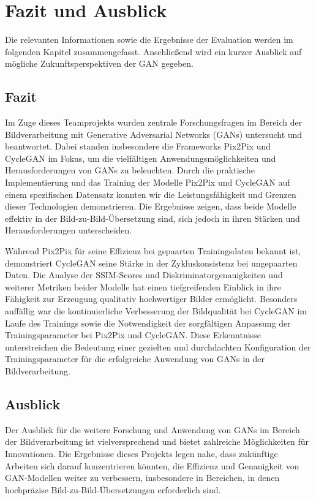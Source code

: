 \chapter{Fazit und Ausblick}

Die relevanten Informationen sowie die Ergebnisse der Evaluation werden im folgenden Kapitel zusammengefasst. Anschließend wird ein kurzer Ausblick auf mögliche Zukunftsperspektiven der GAN gegeben.

\section{Fazit}
Im Zuge dieses Teamprojekts wurden zentrale Forschungsfragen im Bereich der Bildverarbeitung mit Generative Adversarial Networks (GANs) untersucht und beantwortet. Dabei standen insbesondere die Frameworks Pix2Pix und CycleGAN im Fokus, um die vielfältigen Anwendungsmöglichkeiten und Herausforderungen von GANs zu beleuchten. Durch die praktische Implementierung und das Training der Modelle Pix2Pix und CycleGAN auf einem spezifischen Datensatz konnten wir die Leistungsfähigkeit und Grenzen dieser Technologien demonstrieren. Die Ergebnisse zeigen, dass beide Modelle effektiv in der Bild-zu-Bild-Übersetzung sind, sich jedoch in ihren Stärken und Herausforderungen unterscheiden.

Während Pix2Pix für seine Effizienz bei gepaarten Trainingsdaten bekannt ist, demonstriert CycleGAN seine Stärke in der Zykluskonsistenz bei ungepaarten Daten. Die Analyse der SSIM-Scores und Diskriminatorgenauigkeiten und weiterer Metriken beider Modelle hat einen tiefgreifenden Einblick in ihre Fähigkeit zur Erzeugung qualitativ hochwertiger Bilder ermöglicht. Besonders auffällig war die kontinuierliche Verbesserung der Bildqualität bei CycleGAN im Laufe des Trainings sowie die Notwendigkeit der sorgfältigen Anpassung der Trainingsparameter bei Pix2Pix und CycleGAN. Diese Erkenntnisse unterstreichen die Bedeutung einer gezielten und durchdachten Konfiguration der Trainingsparameter für die erfolgreiche Anwendung von GANs in der Bildverarbeitung.

\section{Ausblick}
Der Ausblick für die weitere Forschung und Anwendung von GANs im Bereich der Bildverarbeitung ist vielversprechend und bietet zahlreiche Möglichkeiten für Innovationen. Die Ergebnisse dieses Projekts legen nahe, dass zukünftige Arbeiten sich darauf konzentrieren könnten, die Effizienz und Genauigkeit von GAN-Modellen weiter zu verbessern, insbesondere in Bereichen, in denen hochpräzise Bild-zu-Bild-Übersetzungen erforderlich sind.

